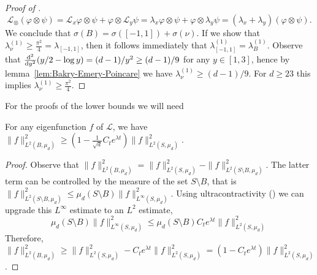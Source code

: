\begin{proof}[Proof of ]
    \begin{equation*}
        \mathcal L_\otimes (\varphi \otimes \psi) = \mathcal{L}_x \varphi \otimes \psi + \varphi \otimes \mathcal L_y \psi = \lambda_x \varphi \otimes \psi + \varphi \otimes \lambda_y \psi = (\lambda_x + \lambda_y) (\varphi \otimes \psi).
    \end{equation*}
    We conclude that \( \sigma(B) = \sigma([-1,1]) + \sigma(\nu) \). If we show that \( \lambda^{(1)}_\nu \ge \frac{\pi^2}{4} = \lambda_{[-1,1]} \), then it follows immediately that \( \lambda_{[-1,1]}^{(1)} = \lambda_B^{(1)} \). Observe that \( \dv[2]{}{y} (d-1)(y/2 - \log y) = (d-1)/y^2 \ge (d-1)/9 \) for any \( y \in [1,3] \), hence by lemma~\ref{lem:Bakry-Emery-Poincare} we have \( \lambda^{(1)}_\nu \ge (d-1)/9 \). For \( d \ge 23 \) this implies \( \lambda^{(1)}_\nu \ge \frac{\pi^2}{4} \).
\end{proof}

For the proofs of the lower bounds we will need

\begin{lemma} \label{lem:ultracontractivity_trick}
    For any eigenfunction \( f \) of \( \mathcal L \), we have \( \|f\|_{L^2(B,\mu_d)}^2 \ge (1-\frac{1}{\sqrt{d}}C_t e^{\lambda t})\|f\|_{L^2(S,\mu_d)}^2 \).
\end{lemma}
\begin{proof}
    Observe that \( \|f\|_{L^2(B,\mu_d)}^2 = \|f\|_{L^2(S,\mu_d)}^2 - \|f\|_{L^2(S \setminus B,\mu_d)}^2 \). The latter term can be controlled by the measure of the set \( S \setminus B \), that is \( \|f\|_{L^2(S \setminus B, \mu_d)}^2 \le \mu_d(S \setminus B) \|f\|^2_{L^\infty(S,\mu_d)} \). Using ultracontractivity () we can upgrade this \( L^\infty \) estimate to an \( L^2 \) estimate,
    \begin{equation*}
        \mu_d(S \setminus B) \|f\|^2_{L^\infty(S,\mu_d)}
        \le \mu_d(S \setminus B) C_t e^{\lambda t} \|f\|^2_{L^2(S,\mu_d)}
    \end{equation*}
    Therefore, \( \|f\|_{L^2(B,\mu_d)}^2 \ge \|f\|_{L^2(S,\mu_d)}^2 - C_t e^{\lambda t}\|f\|_{L^2(S,\mu_d)}^2 = (1-C_t e^{\lambda t})\|f\|_{L^2(S,\mu_d)}^2 \).
\end{proof}

